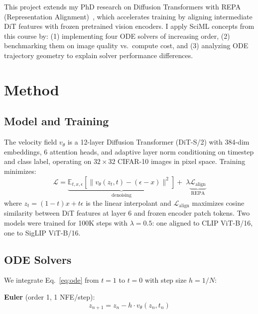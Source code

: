 \documentclass[10pt,twocolumn]{article}
\begin{document}
This project extends my PhD research on Diffusion Transformers with REPA (Representation Alignment)~\citep{yu2024repa}, which accelerates training by aligning intermediate DiT features with frozen pretrained vision encoders. I apply SciML concepts from this course by: (1) implementing four ODE solvers of increasing order, (2) benchmarking them on image quality vs.\ compute cost, and (3) analyzing ODE trajectory geometry to explain solver performance differences.

\section{Method}

\subsection{Model and Training}

The velocity field $v_\theta$ is a 12-layer Diffusion Transformer (DiT-S/2) with 384-dim embeddings, 6 attention heads, and adaptive layer norm conditioning on timestep and class label, operating on $32{\times}32$ CIFAR-10 images in pixel space. Training minimizes:
\begin{equation}
    \mathcal{L} = \underbrace{\mathbb{E}_{t, x, \epsilon}\left[\|v_\theta(z_t, t) - (\epsilon - x)\|^2\right]}_{\text{denoising}} + \;\lambda \underbrace{\mathcal{L}_{\text{align}}}_{\text{REPA}}
\end{equation}
where $z_t = (1{-}t)x + t\epsilon$ is the linear interpolant and $\mathcal{L}_{\text{align}}$ maximizes cosine similarity between DiT features at layer 6 and frozen encoder patch tokens. Two models were trained for 100K steps with $\lambda{=}0.5$: one aligned to CLIP ViT-B/16, one to SigLIP ViT-B/16.

\subsection{ODE Solvers}

We integrate Eq.~\ref{eq:ode} from $t{=}1$ to $t{=}0$ with step size $h = 1/N$:

\vspace{0.5em}
\noindent\textbf{Euler} (order 1, 1 NFE/step):
\vspace{-0.5em}
\begin{equation}
    z_{n+1} = z_n - h \cdot v_\theta(z_n, t_n)
\end{equation}
\end{document}
